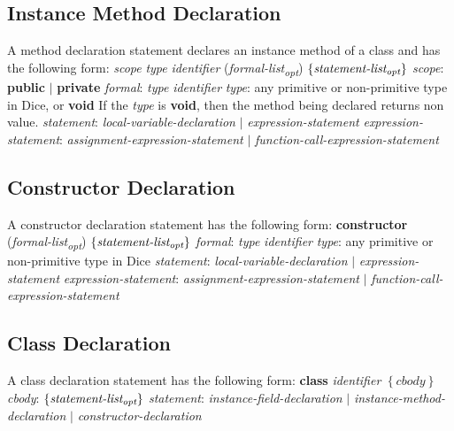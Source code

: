\begin{homeworkProblem}
    \subsection{Instance Method Declaration}
    A method declaration statement declares an instance method of a class and has the following form:
    \newline
    \textit{scope} \textit{type} \textit{identifier} (\textit{formal-list\textsubscript{opt}}) $\left\{ \textit{statement-list\textsubscript{opt}} \right\}$
    \newline
    \textit{scope}: \textbf{public} $|$ \textbf{private}
    \newline
    \textit{formal}: \textit{type} \textit{identifier}
    \newline
    \textit{type}: any primitive or non-primitive type in Dice, or \textbf{void}
    \newline
    If the \textit{type} is \textbf{void}, then the method being declared returns non value.
    \newline
    \textit{statement}: \textit{local-variable-declaration} $|$ \textit{expression-statement}
    \newline
    \textit{expression-statement}: \textit{assignment-expression-statement} $|$ \textit{function-call-expression-statement}

    \subsection{Constructor Declaration}
    A constructor declaration statement has the following form:
    \newline
    \textbf{constructor} (\textit{formal-list\textsubscript{opt}}) $\left\{ \textit{statement-list\textsubscript{opt}} \right\}$
    \newline
    \textit{formal}: \textit{type} \textit{identifier}
    \newline
    \textit{type}: any primitive or non-primitive type in Dice
    \newline
    \textit{statement}: \textit{local-variable-declaration} $|$ \textit{expression-statement}
    \newline
    \textit{expression-statement}: \textit{assignment-expression-statement} $|$ \textit{function-call-expression-statement}

    \subsection{Class Declaration}
    A class declaration statement has the following form:
    \newline
    \textbf{class} \textit{identifier} $\left\{ \textit{cbody} \right\}$
    \newline
    \textit{cbody}: $\left\{ \textit{statement-list\textsubscript{opt}} \right\}$
    \newline
    \textit{statement}: \textit{instance-field-declaration} $|$ \textit{instance-method-declaration} $|$ \textit{constructor-declaration}
	
\end{homeworkProblem}
